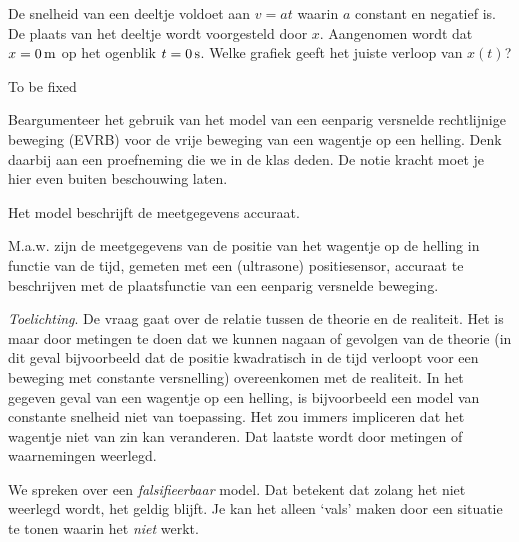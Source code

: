 \documentclass{ximera}
\begin{document}
\begin{exercise}
	De snelheid van een deeltje voldoet aan $v=at$ waarin $a$ constant en negatief is. De plaats van het deeltje wordt voorgesteld door $x$. Aangenomen wordt dat $x=0\rm\,m$ op het ogenblik $t=0\rm\,s$. Welke grafiek geeft het juiste verloop van $x(t)$?

	To be fixed
\end{exercise}

\begin{exercise}
	Beargumenteer het gebruik van het model van een eenparig versnelde rechtlijnige beweging (EVRB) voor de vrije beweging van een wagentje op een helling. Denk daarbij aan een proefneming die we in de klas deden. De notie kracht moet je hier even buiten beschouwing laten.
	\begin{oplossing}
		Het model beschrijft de meetgegevens accuraat.

		M.a.w. zijn de meetgegevens van de positie van het wagentje op de helling in functie van de tijd, gemeten met een (ultrasone) positiesensor, accuraat te beschrijven met de plaatsfunctie van een eenparig versnelde beweging.

		\emph{Toelichting}.
		De vraag gaat over de relatie tussen de theorie en de realiteit. Het is maar door metingen te doen dat we kunnen nagaan of gevolgen van de theorie (in dit geval bijvoorbeeld dat de positie kwadratisch in de tijd verloopt voor een beweging met constante versnelling) overeenkomen met de realiteit. In het gegeven geval van een wagentje op een helling, is bijvoorbeeld een model van constante snelheid niet van toepassing. Het zou immers impliceren dat het wagentje niet van zin kan veranderen. Dat laatste wordt door metingen of waarnemingen weerlegd.

		We spreken over een \textit{falsifieerbaar} model. Dat betekent dat zolang het niet weerlegd wordt, het geldig blijft. Je kan het alleen `vals' maken door een situatie te tonen waarin het \textit{niet} werkt.
	\end{oplossing} 
\end{exercise}

\end{document}
